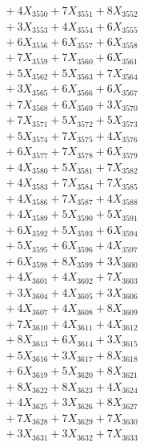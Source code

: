 \documentclass[a4paper,10pt]{article}
\begin{document}
{\begin{align}
&\;  + 4 X_{3550} + 7 X_{3551} + 8 X_{3552} \\[0.3ex]
&\;  + 3 X_{3553} + 4 X_{3554} + 6 X_{3555} \\[0.3ex]
&\;  + 6 X_{3556} + 6 X_{3557} + 6 X_{3558} \\[0.3ex]
&\;  + 7 X_{3559} + 7 X_{3560} + 6 X_{3561} \\[0.3ex]
&\;  + 5 X_{3562} + 5 X_{3563} + 7 X_{3564} \\[0.3ex]
&\;  + 3 X_{3565} + 6 X_{3566} + 6 X_{3567} \\[0.3ex]
&\;  + 7 X_{3568} + 6 X_{3569} + 3 X_{3570} \\[0.3ex]
&\;  + 7 X_{3571} + 5 X_{3572} + 5 X_{3573} \\[0.3ex]
&\;  + 5 X_{3574} + 7 X_{3575} + 4 X_{3576} \\[0.3ex]
&\;  + 6 X_{3577} + 7 X_{3578} + 6 X_{3579} \\[0.5ex]\allowbreak
&\;  + 4 X_{3580} + 5 X_{3581} + 7 X_{3582} \\[0.3ex]
&\;  + 4 X_{3583} + 7 X_{3584} + 7 X_{3585} \\[0.3ex]
&\;  + 4 X_{3586} + 7 X_{3587} + 4 X_{3588} \\[0.3ex]
&\;  + 4 X_{3589} + 5 X_{3590} + 5 X_{3591} \\[0.3ex]
&\;  + 6 X_{3592} + 5 X_{3593} + 6 X_{3594} \\[0.3ex]
&\;  + 5 X_{3595} + 6 X_{3596} + 4 X_{3597} \\[0.3ex]
&\;  + 6 X_{3598} + 8 X_{3599} + 3 X_{3600} \\[0.3ex]
&\;  + 4 X_{3601} + 4 X_{3602} + 7 X_{3603} \\[0.3ex]
&\;  + 3 X_{3604} + 4 X_{3605} + 3 X_{3606} \\[0.3ex]
&\;  + 4 X_{3607} + 4 X_{3608} + 8 X_{3609} \\[0.5ex]\allowbreak
&\;  + 7 X_{3610} + 4 X_{3611} + 4 X_{3612} \\[0.3ex]
&\;  + 8 X_{3613} + 6 X_{3614} + 3 X_{3615} \\[0.3ex]
&\;  + 5 X_{3616} + 3 X_{3617} + 8 X_{3618} \\[0.3ex]
&\;  + 6 X_{3619} + 5 X_{3620} + 8 X_{3621} \\[0.3ex]
&\;  + 8 X_{3622} + 8 X_{3623} + 4 X_{3624} \\[0.3ex]
&\;  + 4 X_{3625} + 3 X_{3626} + 8 X_{3627} \\[0.3ex]
&\;  + 7 X_{3628} + 7 X_{3629} + 7 X_{3630} \\[0.3ex]
&\;  + 3 X_{3631} + 3 X_{3632} + 7 X_{3633} \\[0.3ex]

\end{align}}
\end{document}
